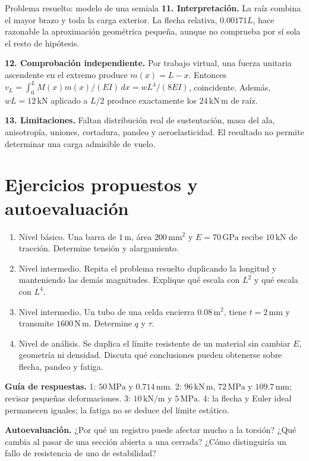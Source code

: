 \begin{studiumworked}{Problema resuelto: modelo de una semiala}
\textbf{11. Interpretación.} La raíz combina el mayor brazo y toda la carga exterior. La flecha relativa, $0.00171L$, hace razonable la aproximación geométrica pequeña, aunque no comprueba por sí sola el resto de hipótesis.

\textbf{12. Comprobación independiente.} Por trabajo virtual, una fuerza unitaria ascendente en el extremo produce $m(x)=L-x$. Entonces $v_L=\int_0^L M(x)m(x)/(EI)\,dx=wL^4/(8EI)$, coincidente. Además, $wL=12\,\mathrm{kN}$ aplicado a $L/2$ produce exactamente los $24\,\mathrm{kN\,m}$ de raíz.

\textbf{13. Limitaciones.} Faltan distribución real de sustentación, masa del ala, anisotropía, uniones, cortadura, pandeo y aeroelasticidad. El resultado no permite determinar una carga admisible de vuelo.


\end{studiumworked}

\section{Ejercicios propuestos y autoevaluación}
\begin{enumerate}
\item Nivel básico. Una barra de $1\,\mathrm{m}$, área $200\,\mathrm{mm^2}$ y $E=70\,\mathrm{GPa}$ recibe $10\,\mathrm{kN}$ de tracción. Determine tensión y alargamiento.
\item Nivel intermedio. Repita el problema resuelto duplicando la longitud y manteniendo las demás magnitudes. Explique qué escala con $L^2$ y qué escala con $L^4$.
\item Nivel intermedio. Un tubo de una celda encierra $0.08\,\mathrm{m^2}$, tiene $t=2\,\mathrm{mm}$ y transmite $1600\,\mathrm{N\,m}$. Determine $q$ y $\tau$.
\item Nivel de análisis. Se duplica el límite resistente de un material sin cambiar $E$, geometría ni densidad. Discuta qué conclusiones pueden obtenerse sobre flecha, pandeo y fatiga.
\end{enumerate}
\textbf{Guía de respuestas.} 1: $50\,\mathrm{MPa}$ y $0.714\,\mathrm{mm}$. 2: $96\,\mathrm{kN\,m}$, $72\,\mathrm{MPa}$ y $109.7\,\mathrm{mm}$; revisar pequeñas deformaciones. 3: $10\,\mathrm{kN/m}$ y $5\,\mathrm{MPa}$. 4: la flecha y Euler ideal permanecen iguales; la fatiga no se deduce del límite estático.

\textbf{Autoevaluación.} ¿Por qué un registro puede afectar mucho a la torsión? ¿Qué cambia al pasar de una sección abierta a una cerrada? ¿Cómo distinguiría un fallo de resistencia de uno de estabilidad?


\studiumchaptercheck

